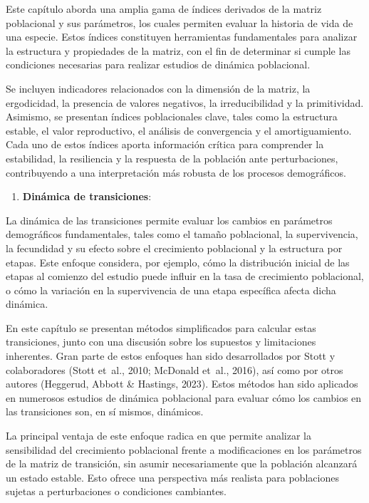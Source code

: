 \documentclass[
  12pt,
  letterpaper,
]{book}
\providecommand{\tightlist}{%
  \setlength{\itemsep}{0pt}\setlength{\parskip}{0pt}}\usepackage{longtable,booktabs,array}
\begin{document}
Este capítulo aborda una amplia gama de índices derivados de la matriz
poblacional y sus parámetros, los cuales permiten evaluar la historia de
vida de una especie. Estos índices constituyen herramientas
fundamentales para analizar la estructura y propiedades de la matriz,
con el fin de determinar si cumple las condiciones necesarias para
realizar estudios de dinámica poblacional.

Se incluyen indicadores relacionados con la dimensión de la matriz, la
ergodicidad, la presencia de valores negativos, la irreducibilidad y la
primitividad. Asimismo, se presentan índices poblacionales clave, tales
como la estructura estable, el valor reproductivo, el análisis de
convergencia y el amortiguamiento. Cada uno de estos índices aporta
información crítica para comprender la estabilidad, la resiliencia y la
respuesta de la población ante perturbaciones, contribuyendo a una
interpretación más robusta de los procesos demográficos.

\begin{enumerate}
\def\labelenumi{\arabic{enumi}.}
\setcounter{enumi}{9}
\tightlist
\item
  \textbf{Dinámica de transiciones}:
\end{enumerate}

La dinámica de las transiciones permite evaluar los cambios en
parámetros demográficos fundamentales, tales como el tamaño poblacional,
la supervivencia, la fecundidad y su efecto sobre el crecimiento
poblacional y la estructura por etapas. Este enfoque considera, por
ejemplo, cómo la distribución inicial de las etapas al comienzo del
estudio puede influir en la tasa de crecimiento poblacional, o cómo la
variación en la supervivencia de una etapa específica afecta dicha
dinámica.

En este capítulo se presentan métodos simplificados para calcular estas
transiciones, junto con una discusión sobre los supuestos y limitaciones
inherentes. Gran parte de estos enfoques han sido desarrollados por
Stott y colaboradores (Stott et~al., 2010; McDonald et~al., 2016), así
como por otros autores (Heggerud, Abbott \& Hastings, 2023). Estos
métodos han sido aplicados en numerosos estudios de dinámica poblacional
para evaluar cómo los cambios en las transiciones son, en sí mismos,
dinámicos.

La principal ventaja de este enfoque radica en que permite analizar la
sensibilidad del crecimiento poblacional frente a modificaciones en los
parámetros de la matriz de transición, sin asumir necesariamente que la
población alcanzará un estado estable. Esto ofrece una perspectiva más
realista para poblaciones sujetas a perturbaciones o condiciones
cambiantes.
\end{document}
